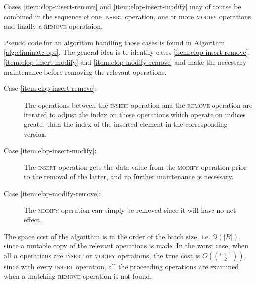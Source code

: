 Cases \ref{item:elop-insert-remove} and \ref{item:elop-insert-modify} may of
course be combined in the sequence of one \textsc{insert} operation, one or more
\textsc{modify} operations and finally a \textsc{remove} operataion.

Pseudo code for an algorithm handling those cases is found in Algorithm
\ref{alg:eliminate-ops}.
The general idea is to identify cases \ref{item:elop-insert-remove},
\ref{item:elop-insert-modify} and \ref{item:elop-modify-remove} and make the
necessary maintenance before removing the relevant operations.

\begin{description}
  \item [Case \ref{item:elop-insert-remove}:] The operations between the
  \textsc{insert} operation and the \textsc{remove} operation are iterated to
  adjust the index on those operations which operate on indices greater than the
  index of the inserted element in the corresponding version.
  
  \item [Case \ref{item:elop-insert-modify}:] The \textsc{insert} operation gets
  the data value from the \textsc{modify} operation prior to the removal of the
  latter, and no further maintenance is necessary.
  
  \item [Case \ref{item:elop-modify-remove}:] The \textsc{modify} operation can
  simply be removed since it will have no net effect.

\end{description}

The space cost of the algorithm is in the order of the batch size, i.e.
$O(\left|B\right|)$, since a mutable copy of the relevant operations is made.
In the worst case, when all $n$ operations are \textsc{insert} or
\textsc{modify} operations, the time cost is $O\left(\binom{n+1}{2}\right)$,
since with every \textsc{insert} operation, all the proceeding operations are
examined when a matching \textsc{remove} operation is not found.

